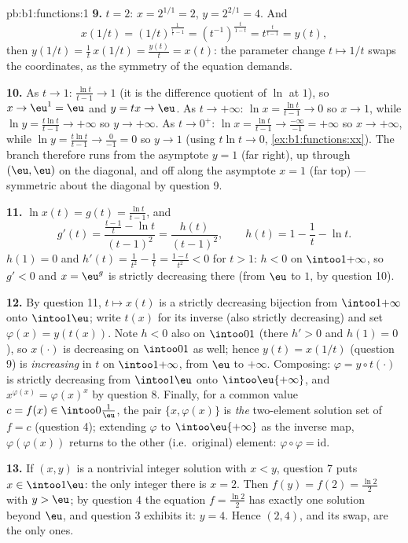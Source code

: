 \begin{solution}{pb:b1:functions:1}
\textbf{9.} $t = 2$: $x = 2^{1/1} = 2$, $y = 2^{2/1} = 4$. And
\[
x(1/t) = (1/t)^{\frac1{\frac1t - 1}}
= (t^{-1})^{\frac{t}{1 - t}}
= t^{\frac{t}{t - 1}} = y(t) ,
\]
then $y(1/t) = \frac1t\,x(1/t) = \frac{y(t)}t = x(t)$: the
parameter change $t \mapsto 1/t$ swaps the coordinates, as the
symmetry of the equation demands.

\textbf{10.} As $t \to 1$: $\frac{\ln t}{t-1} \to 1$ (it is the
difference quotient of $\ln$ at $1$), so $x \to \eu^1 = \eu$ and
$y = tx \to \eu$. As $t \to +\infty$: $\ln x = \frac{\ln t}{t-1}
\to 0$ so $x \to 1$, while $\ln y = \frac{t\ln t}{t-1} \to
+\infty$ so $y \to +\infty$. As $t \to 0^+$: $\ln x = \frac{\ln
t}{t-1} \to \frac{-\infty}{-1} = +\infty$ so $x \to +\infty$,
while $\ln y = \frac{t\ln t}{t-1} \to \frac{0}{-1} = 0$ so $y \to
1$ (using $t\ln t \to 0$, \cref{ex:b1:functions:xx}). The branch
therefore runs from the asymptote $y = 1$ (far right), up through
$(\eu, \eu)$ on the diagonal, and off along the asymptote $x = 1$
(far top) --- symmetric about the diagonal by question 9.

\textbf{11.} $\ln x(t) = g(t) = \frac{\ln t}{t-1}$, and
\[
g'(t) = \frac{\frac{t-1}t - \ln t}{(t-1)^2}
= \frac{h(t)}{(t-1)^2},
\qquad h(t) = 1 - \frac1t - \ln t .
\]
$h(1) = 0$ and $h'(t) = \frac1{t^2} - \frac1t = \frac{1 -
t}{t^2} < 0$ for $t > 1$: $h < 0$ on $\intoo1{+\infty}$, so $g' <
0$ and $x = \eu^g$ is strictly decreasing there (from $\eu$ to
$1$, by question 10).

\textbf{12.} By question 11, $t \mapsto x(t)$ is a strictly
decreasing bijection from $\intoo1{+\infty}$ onto $\intoo1\eu$;
write $t(x)$ for its inverse (also strictly decreasing) and set
$\varphi(x) = y(t(x))$. Note $h < 0$ also on $\intoo01$ (there
$h' > 0$ and $h(1) = 0$), so $x(\cdot)$ is decreasing on
$\intoo01$ as well; hence $y(t) = x(1/t)$ (question 9) is
\emph{increasing} in $t$ on $\intoo1{+\infty}$, from $\eu$ to
$+\infty$. Composing: $\varphi = y \circ t(\cdot)$ is strictly
decreasing from $\intoo1\eu$ onto $\intoo\eu{+\infty}$, and
$x^{\varphi(x)} = \varphi(x)^x$ by question 8. Finally, for a
common value $c = f(x) \in \intoo0{\frac1\eu}$, the pair $\{x,
\varphi(x)\}$ is \emph{the} two-element solution set of $f = c$
(question 4); extending $\varphi$ to $\intoo\eu{+\infty}$ as the
inverse map, $\varphi(\varphi(x))$ returns to the other (i.e.\
original) element: $\varphi \circ \varphi = \mathrm{id}$.

\textbf{13.} If $(x, y)$ is a nontrivial integer solution with $x
< y$, question 7 puts $x \in \intoo1\eu$: the only integer there
is $x = 2$. Then $f(y) = f(2) = \frac{\ln2}2$ with $y > \eu$; by
question 4 the equation $f = \frac{\ln2}2$ has exactly one
solution beyond $\eu$, and question 3 exhibits it: $y = 4$. Hence
$(2, 4)$, and its swap, are the only ones.


\end{solution}
